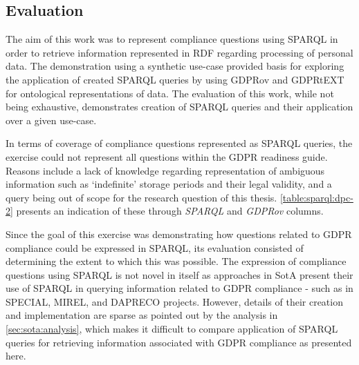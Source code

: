 \subsection{Evaluation}\label{sec:testing:sparql:evaluation}
The aim of this work was to represent compliance questions using SPARQL in order to retrieve information represented in RDF regarding processing of personal data.
The demonstration using a synthetic use-case provided basis for exploring the application of created SPARQL queries by using GDPRov and GDPRtEXT for ontological representations of data.
The evaluation of this work, while not being exhaustive, demonstrates creation of SPARQL queries and their application over a given use-case.

In terms of coverage of compliance questions represented as SPARQL queries, the exercise could not represent all questions within the GDPR readiness guide.
Reasons include a lack of knowledge regarding representation of ambiguous information such as `indefinite' storage periods and their legal validity, and a query being out of scope for the research question of this thesis.
\autoref{table:sparql:dpc-2} presents an indication of these through \textit{SPARQL} and \textit{GDPRov} columns.

Since the goal of this exercise was demonstrating how questions related to GDPR compliance could be expressed in SPARQL, its evaluation consisted of determining the extent to which this was possible. 
The expression of compliance questions using SPARQL is not novel in itself as approaches in SotA present their use of SPARQL in querying information related to GDPR compliance - such as in SPECIAL, MIREL, and DAPRECO projects.
However, details of their creation and implementation are sparse as pointed out by the analysis in \autoref{sec:sota:analysis}, which makes it difficult to compare application of SPARQL queries for retrieving information associated with GDPR compliance as presented here.

